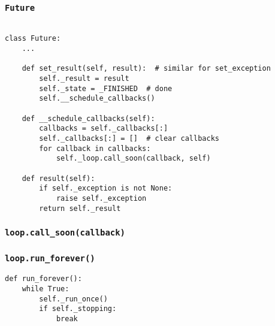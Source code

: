 \documentclass[compress,usenames,dvipsnames]{beamer}
\begin{document}
\begin{frame}
    \frametitle{\lstinline{Future}}
    \scriptsize
    \begin{lstlisting}

class Future:
    ...

    def set_result(self, result):  # similar for set_exception
        self._result = result
        self._state = _FINISHED  # done
        self.__schedule_callbacks()

    def __schedule_callbacks(self):
        callbacks = self._callbacks[:]
        self._callbacks[:] = []  # clear callbacks
        for callback in callbacks:
            self._loop.call_soon(callback, self)

    def result(self):
        if self._exception is not None:
            raise self._exception
        return self._result
    \end{lstlisting}
\end{frame}

\begin{frame}[plain]
    \frametitle{\lstinline{loop.call_soon(callback)}}
    \begin{algorithm}[H]
        \SetAlgoNoEnd
        \DontPrintSemicolon
    \end{algorithm}
\end{frame}

\begin{frame}
    \frametitle{\lstinline{loop.run_forever()}}
    \begin{lstlisting}
def run_forever():
    while True:
        self._run_once()
        if self._stopping:
            break
    \end{lstlisting}
\end{frame}
\end{document}
